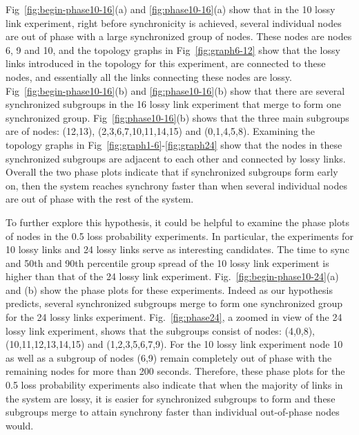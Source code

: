 \noindent
Fig~\ref{fig:begin-phase10-16}(a) and \ref{fig:phase10-16}(a) show that in the 10 lossy link experiment, right before synchronicity is achieved,
several individual nodes are out of phase with a large synchronized group of nodes. These nodes are nodes 6, 9 and 10, and the
topology graphs in Fig~\ref{fig:graph6-12} show that the lossy links introduced in the topology for this experiment, are connected to these nodes, and essentially all the links connecting these nodes are lossy.
Fig~\ref{fig:begin-phase10-16}(b) and \ref{fig:phase10-16}(b) show that there are several synchronized subgroups
in the 16 lossy link experiment that merge to form one synchronized group. Fig~\ref{fig:phase10-16}(b) shows that
the three main subgroups are of nodes: (12,13), (2,3,6,7,10,11,14,15) and (0,1,4,5,8).
Examining the topology graphs in Fig~\ref{fig:graph1-6}-\ref{fig:graph24}
show that the nodes in these synchronized subgroups are adjacent to each other and connected by lossy links. 
Overall the two phase plots indicate that if synchronized subgroups form early on, then the system reaches synchrony
faster than when several individual nodes are out of phase with the rest of the system. \newline

\noindent
To further explore this hypothesis, it could be helpful to examine the phase plots of nodes in the 0.5 loss probability
experiments.
In particular, the experiments for 10 lossy links and 24 lossy links serve as interesting candidates.
The time to sync and 50th and 90th percentile group spread of the 10 lossy link experiment is higher
than that of the 24 lossy link experiment.  
Fig.~\ref{fig:begin-phase10-24}(a) and (b) show the phase plots for these experiments.
Indeed as our hypothesis predicts, several synchronized subgroups merge
to form one synchronized group for the 24 lossy links experiment.  Fig.~\ref{fig:phase24}, a zoomed in view of the 24 lossy
link experiment, shows that the subgroups consist of nodes: (4,0,8), (10,11,12,13,14,15) and (1,2,3,5,6,7,9).  
For the 10 lossy link experiment node 10 as well as 
a subgroup of nodes (6,9) remain completely out of phase with the remaining nodes for more than 200 seconds.  
Therefore, these phase plots for the 0.5 loss probability experiments also indicate that when the majority of
links in the system are lossy, it is easier for synchronized subgroups to form and these subgroups merge to attain synchrony
faster than individual out-of-phase nodes would.   \newline

